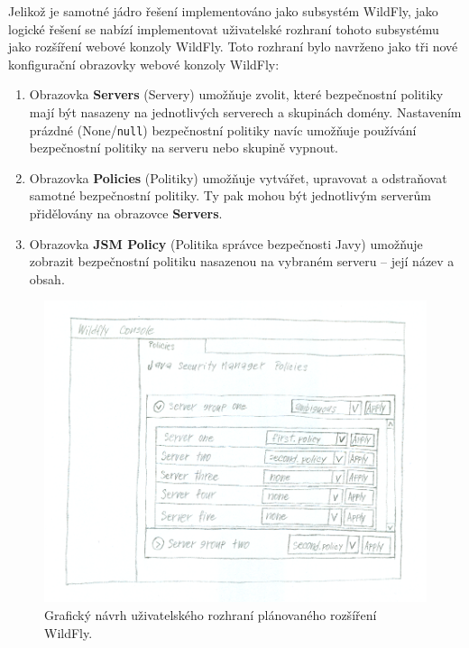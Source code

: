 Jelikož je samotné jádro řešení implementováno jako subsystém WildFly, jako logické řešení se nabízí implementovat uživatelské rozhraní tohoto subsystému jako rozšíření webové konzoly WildFly.
Toto rozhraní bylo navrženo jako tři nové konfigurační obrazovky webové konzoly WildFly:

\begin{enumerate}
  \item Obrazovka {\bf Servers} (Servery) umožňuje zvolit, které bezpečnostní politiky mají být nasazeny na jednotlivých serverech a skupinách domény. Nastavením prázdné (None/{\tt null}) bezpečnostní politiky navíc umožňuje používání bezpečnostní politiky na serveru nebo skupině vypnout.
  \item Obrazovka {\bf Policies} (Politiky) umožňuje vytvářet, upravovat a odstraňovat samotné bezpečnostní politiky. Ty pak mohou být jednotlivým serverům přidělovány na obrazovce {\bf Servers}.
  \item Obrazovka {\bf JSM Policy} (Politika správce bezpečnosti Javy) umožňuje zobrazit bezpečnostní politiku nasazenou na vybraném serveru -- její název a obsah.
\end{enumerate}

\begin{figure}[ht]
  \centering
  \includegraphics[width=14cm]{fig/mockup}
  \caption{Grafický návrh uživatelského rozhraní plánovaného rozšíření WildFly.}
  \label{navrhGui}
\end{figure}

